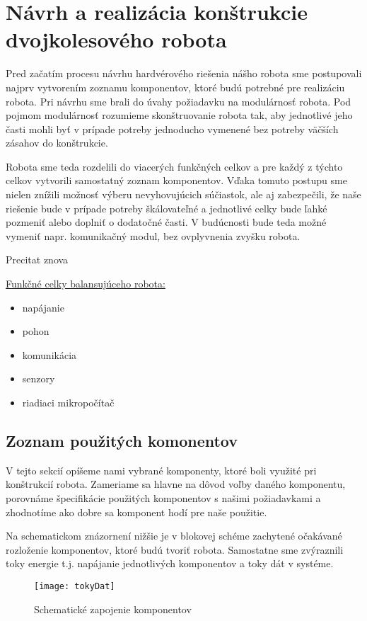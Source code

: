 \chapter{Návrh a realizácia konštrukcie dvojkolesového robota}

Pred začatím procesu návrhu hardvérového riešenia nášho robota sme postupovali najprv vytvorením zoznamu komponentov, ktoré budú potrebné pre realizáciu robota. Pri návrhu sme brali do úvahy požiadavku na modulárnosť robota. Pod pojmom modulárnosť rozumieme skonštruovanie robota tak, aby jednotlivé jeho časti mohli byť v prípade potreby jednoducho vymenené bez potreby väčších zásahov do konštrukcie. 

Robota sme teda rozdelili do viacerých funkčných celkov a pre každý z týchto celkov vytvorili samostatný zoznam komponentov. Vďaka tomuto postupu sme nielen znížili možnosť výberu nevyhovujúcich súčiastok, ale aj zabezpečili, že naše riešenie bude v prípade potreby škálovateľné a jednotlivé celky bude ľahké pozmeniť alebo doplniť o dodatočné časti. V budúcnosti bude teda možné vymeniť napr. komunikačný modul, bez ovplyvnenia zvyšku robota.

\todo[inline] Precitat znova

\underline{Funkčné celky balansujúceho robota:}
\begin{itemize}
\item napájanie
\item pohon
\item komunikácia
\item senzory
\item riadiaci mikropočítač
\end{itemize}

\section{Zoznam použitých komonentov}

V tejto sekcií opíšeme nami vybrané komponenty, ktoré boli využité pri konštrukcií robota. Zameriame sa hlavne na dôvod voľby daného komponentu, porovnáme špecifikácie použitých komponentov s našimi požiadavkami a zhodnotíme ako dobre sa komponent hodí pre naše použitie.

Na schematickom znázornení nižšie je v blokovej schéme zachytené očakávané rozloženie komponentov, ktoré budú tvoriť robota. Samostatne sme zvýraznili toky energie t.j. napájanie jednotlivých komponentov a toky dát v systéme. 

\begin{figure}
\centering
\texttt{[image: tokyDat]}
\caption{Schematické zapojenie komponentov}
\label{fig:tokyDat}
\end{figure}

